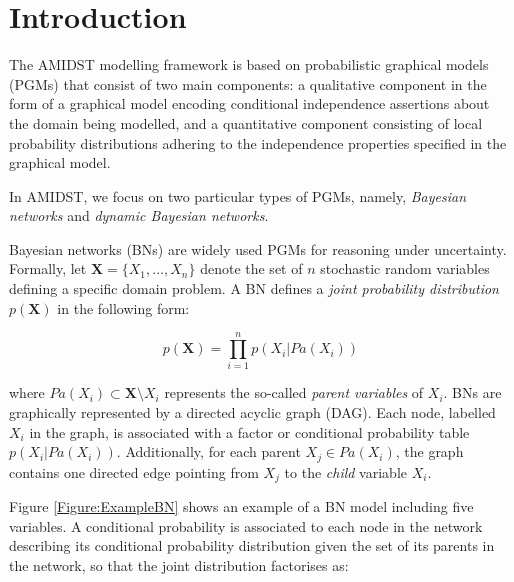 \section{Introduction}

The AMIDST modelling framework \cite{Deliverable2.1} is based on probabilistic graphical models (PGMs) that consist of two main components: a qualitative component in the form of a graphical model encoding conditional independence assertions about the domain being modelled, and a quantitative component consisting of local probability distributions adhering to the independence properties specified in the graphical model. 

In AMIDST, we focus on two particular types of PGMs, namely, \emph{Bayesian networks} and \emph{dynamic Bayesian networks}.


Bayesian networks (BNs) \cite{JensenNielsen2007,Pearl1988} are widely used PGMs for reasoning under uncertainty. Formally, let $\bm X = \{X_1,\ldots,X_n\}$ denote the set of $n$ stochastic random variables defining a specific domain problem. A BN defines a \emph{joint probability distribution} $p(\bm X)$ in the following form:

\vspace{-0.15in}
$$ p(\bm X) = \prod_{i=1}^n p(X_i|Pa(X_i))$$ 

\noindent where $Pa(X_i)\subset \bm X\setminus X_i$ represents the so-called \emph{parent variables} of $X_i$. BNs are graphically represented by a directed acyclic graph (DAG). Each node, labelled $X_i$ in the graph, is associated with a factor or conditional probability table $p(X_i|Pa(X_i))$. Additionally, for each parent $X_j \in Pa(X_i)$, the graph contains one directed edge pointing from $X_j$ to the \emph{child} variable $X_i$.

Figure \ref{Figure:ExampleBN} shows an example of a BN model including five variables. A conditional probability is associated to each node in the network describing its conditional probability distribution given the set of its parents in the network, so that the joint distribution factorises as:

